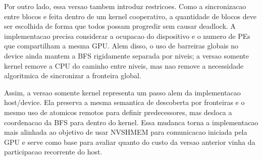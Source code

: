 \documentclass{article}
\begin{document}
Por outro lado, essa versao tambem introduz restricoes. Como a sincronizacao
entre blocos e feita dentro de um kernel cooperativo, a quantidade de blocos deve
ser escolhida de forma que todos possam progredir sem causar deadlock. A
implementacao precisa considerar a ocupacao do dispositivo e o numero de PEs que
compartilham a mesma GPU. Alem disso, o uso de barreiras globais no device ainda
mantem a BFS rigidamente separada por niveis; a versao somente kernel remove a
CPU do caminho entre niveis, mas nao remove a necessidade algoritmica de
sincronizar a fronteira global.

Assim, a versao somente kernel representa um passo alem da implementacao
host/device. Ela preserva a mesma semantica de descoberta por fronteiras e o
mesmo uso de atomicos remotos para definir predecessores, mas desloca a
coordenacao da BFS para dentro do kernel. Essa mudanca torna a implementacao
mais alinhada ao objetivo de usar NVSHMEM para comunicacao iniciada pela GPU e
serve como base para avaliar quanto do custo da versao anterior vinha da
participacao recorrente do host.



\end{document}

